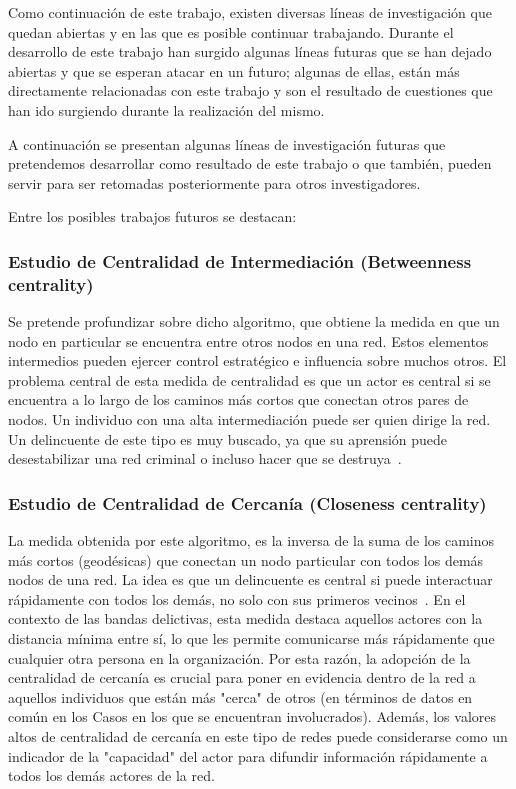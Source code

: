 Como continuación de este trabajo, existen diversas líneas de investigación que quedan abiertas y en las que es posible continuar trabajando. Durante el desarrollo de este trabajo han surgido algunas líneas futuras que se han dejado abiertas y que se esperan atacar en un futuro; algunas de ellas, están más directamente relacionadas con este trabajo y son el resultado de cuestiones que han ido surgiendo durante la realización del mismo.

A continuación se presentan algunas líneas de investigación futuras que pretendemos desarrollar como resultado de este trabajo o que también, pueden servir para ser retomadas posteriormente para otros investigadores. 

Entre los posibles trabajos futuros se destacan:

\subsubsection{Estudio de Centralidad de Intermediación (Betweenness centrality)}
Se pretende profundizar sobre dicho algoritmo, que obtiene la medida en que un nodo en particular se encuentra entre otros nodos en una red. Estos elementos intermedios pueden ejercer control estratégico e influencia sobre muchos otros. El problema central de esta medida de centralidad es que un actor es central si se encuentra a lo largo de los caminos más cortos que conectan otros pares de nodos. Un individuo con una alta intermediación puede ser quien dirige la red. Un delincuente de este tipo es muy buscado, ya que su aprensión puede desestabilizar una red criminal o incluso hacer que se destruya~\cite{ref_article32}.

\subsubsection{Estudio de Centralidad de Cercanía (Closeness centrality)} 
La medida obtenida por este algoritmo, es la inversa de la suma de los caminos más cortos (geodésicas) que conectan un nodo particular con todos los demás nodos de una red. La idea es que un delincuente es central si puede interactuar rápidamente con todos los demás, no solo con sus primeros vecinos~\cite{ref_article33}. En el contexto de las bandas delictivas, esta medida destaca aquellos actores con la distancia mínima entre sí, lo que les permite comunicarse más rápidamente que cualquier otra persona en la organización. Por esta razón, la adopción de la centralidad de cercanía es crucial para poner en evidencia dentro de la red a aquellos individuos que están más "cerca" de otros (en términos de datos en común en los Casos en los que se encuentran involucrados). Además, los valores altos de centralidad de cercanía en este tipo de redes puede considerarse como un indicador de la "capacidad" del actor para difundir información rápidamente a todos los demás actores de la red.

